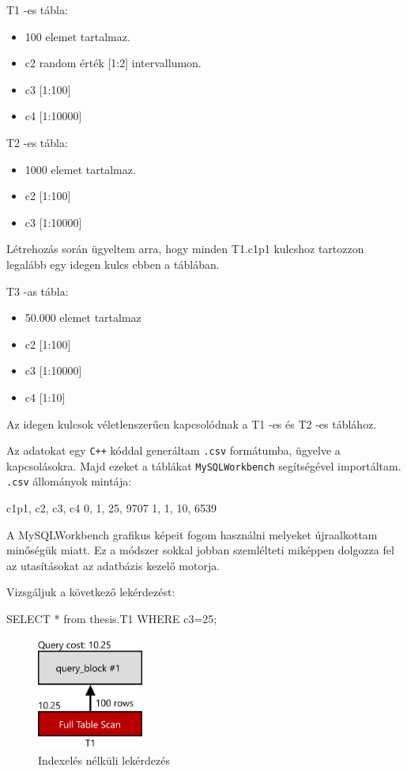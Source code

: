 T1 -es tábla:
\begin{itemize}
\item 100 elemet tartalmaz.
\item c2    random érték [1:2] intervallumon.
\item c3    [1:100]
\item c4    [1:10000]
\end{itemize}
T2 -es tábla:
\begin{itemize}
\item 1000 elemet tartalmaz.
\item c2    [1:100]
\item c3    [1:10000]
\end{itemize}
Létrehozás során ügyeltem arra, hogy minden T1.c1p1 kulcshoz tartozzon legalább egy idegen kulcs ebben a táblában.

T3 -as tábla:
\begin{itemize}   
\item 50.000 elemet tartalmaz
\item c2    [1:100]
\item c3    [1:10000]
\item c4    [1:10]
\end{itemize}
Az idegen kulcsok véletlenszerűen kapcsolódnak a T1 -es és T2 -es táblához.





Az adatokat egy \texttt{C++} kóddal generáltam \texttt{.csv} formátumba, ügyelve a kapcsolásokra. Majd ezeket a táblákat \texttt{MySQLWorkbench} segítségével importáltam. \texttt{.csv} állományok mintája:
\begin{python}
c1p1, c2, c3, c4
0, 1, 25, 9707
1, 1, 10, 6539
\end{python}
\newpage
{}

A MySQLWorkbench grafikus képeit fogom használni melyeket újraalkottam minőségük miatt. Ez a módszer sokkal jobban szemlélteti miképpen dolgozza fel az utasításokat az adatbázis kezelő motorja.

Vizsgáljuk a következő lekérdezést:
\begin{python}
SELECT * from thesis.T1 WHERE c3=25; 
\end{python}
\begin{figure}[h!]
\centering
\includegraphics[width=3.5cm]{images/explain/1-1.png}
\caption{Indexelés nélküli lekérdezés}
\label{fig:schema}
\end{figure}

